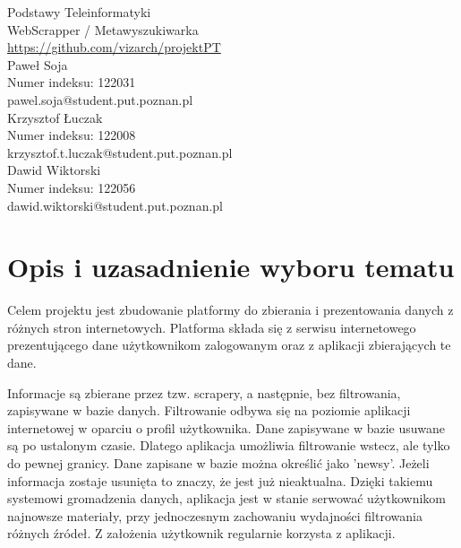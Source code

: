 \documentclass[12pt, titlepage]{article}
\begin{document}
	\begin{titlepage}
		\thispagestyle{firstpage}
		\centering
			\vspace*{5cm}
			{\huge Podstawy Teleinformatyki\\
				WebScrapper / Metawyszukiwarka\\}
			\vspace{6cm}
			{\large \url{https://github.com/vizarch/projektPT}\\}
			\vspace{1cm}
			{\large
			Paweł Soja\\
			Numer indeksu: 122031\\
			pawel.soja@student.put.poznan.pl\\
			\vspace{0.5cm}
			Krzysztof Łuczak\\
			Numer indeksu: 122008\\
			krzysztof.t.luczak@student.put.poznan.pl\\
			\vspace{0.5cm}
			Dawid Wiktorski\\
			Numer indeksu: 122056\\
			dawid.wiktorski@student.put.poznan.pl\\}
	\end{titlepage}
	\tableofcontents
	\listoftables
	
	\newpage
	\section{Opis i uzasadnienie wyboru tematu}
	Celem projektu jest zbudowanie platformy do zbierania i prezentowania danych z różnych stron internetowych. Platforma składa się z serwisu internetowego prezentującego dane użytkownikom zalogowanym oraz z aplikacji zbierających te dane.
	
	Informacje są zbierane przez tzw. scrapery, a następnie, bez filtrowania, zapisywane w bazie danych. Filtrowanie odbywa się na poziomie aplikacji internetowej w oparciu o profil użytkownika. Dane zapisywane w bazie usuwane są po ustalonym czasie. Dlatego aplikacja umożliwia filtrowanie wstecz, ale tylko do pewnej granicy. Dane zapisane w bazie można określić jako 'newsy'. Jeżeli informacja zostaje usunięta to znaczy, że jest już nieaktualna. Dzięki takiemu systemowi gromadzenia danych, aplikacja jest w stanie serwować użytkownikom najnowsze materiały, przy jednoczesnym zachowaniu wydajności filtrowania różnych źródeł. Z założenia użytkownik regularnie korzysta z aplikacji.
	
\end{document}
